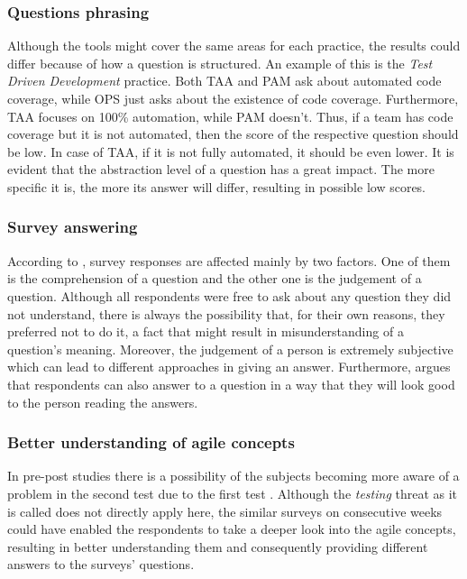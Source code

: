 \subsubsection{Questions phrasing}
Although the tools might cover the same areas for each practice, the results could differ because of how a question is structured. An example of this is the \textit{Test Driven Development} practice. Both \ac{TAA} and \ac{PAM} ask about automated code coverage, while \ac{OPS} just asks about the existence of code coverage. Furthermore, \ac{TAA} focuses on 100\% automation, while \ac{PAM} doesn’t. Thus, if a team has code coverage but it is not automated, then the score of the respective question should be low. In case of \ac{TAA}, if it is not fully automated, it should be even lower. It is evident that the abstraction level of a question has a great impact. The more specific it is, the more its answer will differ, resulting in possible low scores.

\subsubsection{Survey answering}
According to \citet{Wagner_Zeglovits}, survey responses are affected mainly by two factors. One of them is the comprehension of a question and the other one is the judgement of a question. Although all respondents were free to ask about any question they did not understand, there is always the possibility that, for their own reasons, they preferred not to do it, a fact that might result in misunderstanding of a question's meaning. Moreover, the judgement of a person is extremely subjective which can lead to different approaches in giving an answer. Furthermore, \citet{Floyd_Fowler} argues that respondents can also answer to a question in a way that they will look good to the person reading the answers. 

\subsubsection{Better understanding of agile concepts}
In pre-post studies there is a possibility of the subjects becoming more aware of a problem in the second test due to the first test \cite{Campbell_Stanley}. Although the \textit{testing} threat as it is called does not directly apply here, the similar surveys on consecutive weeks could have enabled the respondents to take a deeper look into the agile concepts, resulting in better understanding them and consequently providing different answers to the surveys' questions. 

